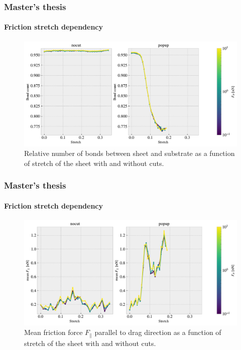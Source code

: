 \documentclass[
	10pt, %
]{beamer}
\begin{document}
\begin{frame}
	\frametitle{Master's thesis}
	\framesubtitle{Friction stretch dependency}
	\begin{figure}
		\includegraphics[width=\linewidth]{figures/multi_3.pdf}
		\caption{Relative number of bonds between sheet and substrate as a function of stretch of the sheet with and without cuts.}
	\end{figure}	
\end{frame}

\begin{frame}
	\frametitle{Master's thesis}
	\framesubtitle{Friction stretch dependency}
	\begin{figure}
		\includegraphics[width=\linewidth]{figures/multi_2.pdf}
		\caption{Mean friction force $F_{\parallel}$ parallel to drag direction as a function of stretch of the sheet with and without cuts.}
	\end{figure}	
\end{frame}
\end{document}
